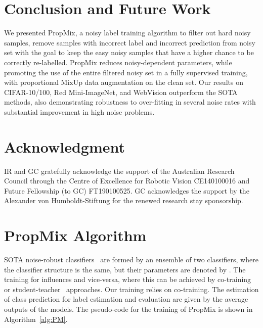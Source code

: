 \documentclass{bmvc2k}
\begin{document}
\vspace{-.3in}
\section{Conclusion and Future Work}


We presented PropMix, a noisy label training algorithm to filter out hard noisy samples, remove samples with incorrect label and incorrect prediction from noisy set with the goal to keep the easy noisy samples that have a higher chance to be correctly re-labelled. PropMix reduces noisy-dependent parameters, while promoting the use of the entire filtered noisy set in a fully supervised training, with proportional MixUp data augmentation on the clean set. Our results on CIFAR-10/100, Red Mini-ImageNet, and WebVision outperform the SOTA methods, also demonstrating robustness to over-fitting in several noise rates with substantial improvement in high noise problems. 


\section{Acknowledgment}
IR and GC gratefully acknowledge the support of the Australian Research Council through the Centre of Excellence for Robotic Vision CE140100016 and Future Fellowship (to GC) FT190100525.  GC acknowledges the support by the Alexander von Humboldt-Stiftung for the renewed research stay sponsorship. 




\newpage

\appendix

\section{PropMix Algorithm}
\label{sec:algorithm}

SOTA noise-robust classifiers~\citep{DivideMix,nguyen2019self, elr2020} are formed by an ensemble of two classifiers, where the classifier structure is the same, but their parameters are denoted by .  The training for  influences  and vice-versa, where this can be achieved by co-training~\cite{DivideMix, elr2020}  or student-teacher~\cite{nguyen2019self} approaches. Our training relies on co-training. The estimation of class prediction for label estimation and evaluation are given by the average outputs of the models. The pseudo-code for the training of PropMix is shown in Algorithm~\ref{alg:PM}.
\end{document}
